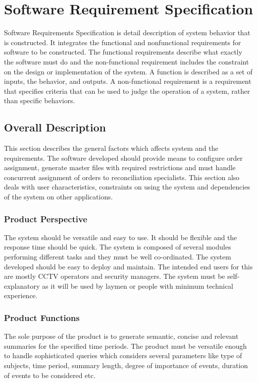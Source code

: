 \chapter{Software Requirement Specification}

Software Requirements Specification is detail description of system behavior that is constructed. It integrates the functional and nonfunctional requirements for software to be constructed. The functional requirements describe what exactly the software must do and the non-functional requirement includes the constraint on the design or implementation of the system. A function is described as a set of inputs, the behavior, and outputs. A non-functional requirement is a requirement that specifies criteria that can be used to judge the operation of a system, rather than specific behaviors.

\section{Overall Description}

This section describes the general factors which affects system and the requirements. The software developed should provide means to configure order assignment, generate master files with required restrictions and must handle concurrent assignment of orders to reconciliation specialists. This section also deals with user characteristics, constraints on using the system and dependencies of the system on other applications.

    \subsection{Product Perspective}
    The system should be versatile and easy to use. It should be flexible and the response time should be quick. The system is composed of several modules performing different tasks and they must be well co-ordinated. The system developed should be easy to deploy and maintain. The intended end users for this are mostly CCTV operators and security managers. The system must be self-explanatory as it will be used by laymen or people with minimum technical experience.

    \subsection{Product Functions}
    The sole purpose of the product is to generate semantic, concise and relevant summaries for the specified time periods. The product must be versatile enough to handle sophisticated queries which considers several parameters like type of subjects, time period, summary length, degree of importance of events, duration of events to be considered etc.

